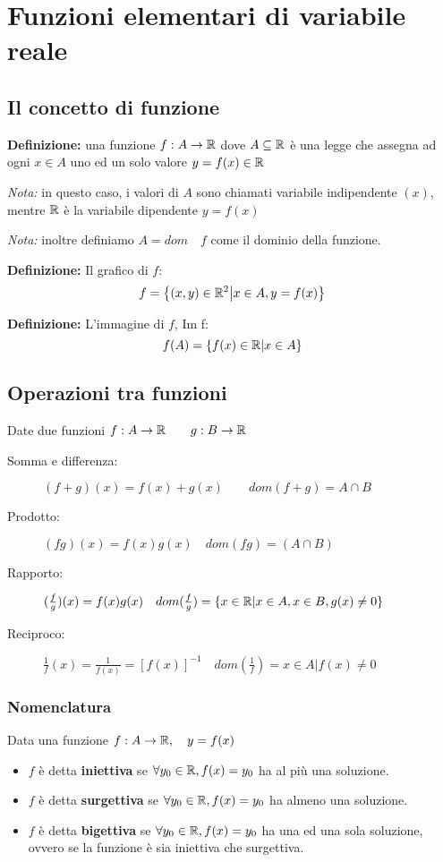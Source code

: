
\chapter{Funzioni elementari di variabile reale} %

\label{ch:funzioni-elementari} %


\section{Il concetto di funzione}
\textbf{Definizione:} una funzione $f: A \rightarrow \mathbb{R}$ dove $A \subseteq \mathbb{R}$ è una legge che assegna ad ogni $x\in A$ uno ed un solo valore $y=f(x) \in \mathbb{R}$

\textit{Nota:} in questo caso, i valori di $A$ sono chiamati variabile indipendente $(x)$, mentre  $\mathbb{R}$ è la variabile dipendente $y=f(x)$

\textit{Nota:} inoltre definiamo $A=dom \quad f$ come il dominio della funzione.

\textbf{Definizione:} Il grafico di $f$:
	\[f=\left\{ (x,y) \in \mathbb{R}^2 \middle| x \in A, y=f(x) \right\}\]

\textbf{Definizione:} L'immagine di $f$, Im f:
	\[f(A)=\left\{ f(x) \in \mathbb{R} \middle| x \in A \right\}\]

\section{Operazioni tra funzioni}
Date due funzioni $f:A\rightarrow \mathbb{R} \qquad g:B\rightarrow \mathbb{R}$
\begin{description}
	\item[Somma e differenza:] $(f+g)(x)=f(x)+g(x) \qquad dom(f+g)=A\cap B$
	\item[Prodotto:] $(fg)(x)=f(x)g(x) \quad dom(fg)=(A\cap B)$
	\item[Rapporto:] $(\frac{f}{g})(x)=f(x)g(x) \quad dom(\frac{f}{g})=\{x\in \mathbb{R} | x\in A, x\in B, g(x) \neq 0\}$
	\item[Reciproco:] $\frac{1}{f}(x)=\frac{1}{f(x)}=[f(x)]^{-1} \quad dom(\frac{1}{f})={x\in A | f(x) \neq 0}$
\end{description}

\subsection{Nomenclatura}
Data una funzione $f: A \rightarrow \mathbb{R} , \quad y=f(x)$
\begin{itemize}
	\item $f$ è detta \textbf{iniettiva} se $\forall y_0 \in \mathbb{R} , f(x)=y_0$ ha al più una soluzione.
	\item $f$ è detta \textbf{surgettiva} se $\forall y_0 \in \mathbb{R} , f(x)=y_0$ ha almeno una soluzione.
	\item $f$ è detta \textbf{bigettiva} se $\forall y_0 \in \mathbb{R} , f(x)=y_0$ ha una ed una sola soluzione, ovvero se la funzione è sia iniettiva che surgettiva.
\end{itemize}

